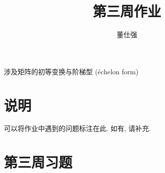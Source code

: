\documentclass[11pt]{ctexart}
\title{第三周作业}
\author{董仕强}
\theoremstyle{definition}
\numberwithin{equation}{section}
\begin{document}
\maketitle
{涉及矩阵的初等变换与阶梯型 (échelon form)}
\section{说明}

可以将作业中遇到的问题标注在此. 如有, 请补充.

\tableofcontents

\newpage


\section{第三周习题}
\end{document}
